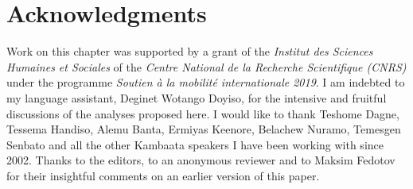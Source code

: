\documentclass[output=paper,colorlinks,citecolor=brown,]{langscibook}
\begin{document}
\section*{Acknowledgments}
Work on this chapter was supported by a grant of the \textit{Institut des Sciences Humaines et Sociales} of the \textit{Centre National de la Recherche Scientifique (CNRS)} under the programme \textit{Soutien à la mobilité internationale 2019}. I am indebted to my language assistant, Deginet Wotango Doyiso, for the intensive and fruitful discussions of the analyses proposed here. I would like to thank Teshome Dagne, Tessema Handiso, Alemu Banta, Ermiyas Keenore, Belachew Nuramo, Temesgen Senbato and all the other Kambaata speakers I have been working with since 2002. Thanks to the editors, to an anonymous reviewer and to Maksim Fedotov for their insightful comments on an earlier version of this paper.



\printbibliography[heading=subbibliography,notkeyword=this]
\end{document}

